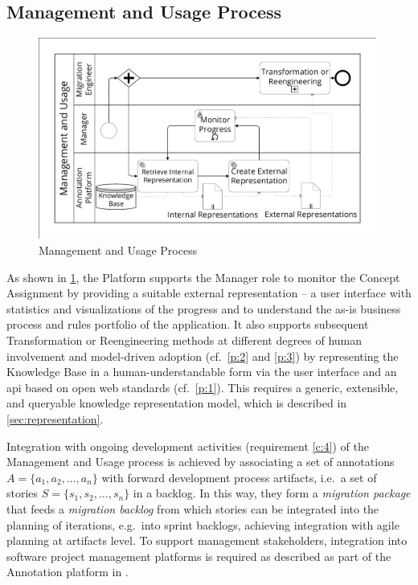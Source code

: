 \vspace{-10pt}
\hypertarget{sec:re.conceptual.process.usage}{%
\subsection{Management and Usage Process}\label{sec:re.conceptual.process.usage}}
\vspace{10pt}

\begin{figure}[h!]
\hypertarget{fig:awsm.re.usage}{%
\centering
\includegraphics[width=0.99\textwidth]{../figures/awsm-re-usage.pdf}
\caption{Management and Usage Process}\label{fig:awsm.re.usage}
}
\end{figure}
As shown in \cref{fig:awsm.re.usage}, the Platform supports the Manager role to monitor the \gls{Concept Assignment} by providing a suitable external representation -- a user interface with statistics and visualizations of the progress and to understand the as-is business process and rules portfolio of the  application.
It also supports subsequent \gls{Transformation} or \gls{Reengineering} methods at different degrees of human involvement and model-driven adoption (cf.~\cref{p:2} and \cref{p:3}) by representing the Knowledge Base in a human-understandable form via the user interface and an \gls{api} based on open \gls{web} standards (cf.~\cref{p:1}).
This requires a generic, extensible, and queryable knowledge representation model, which is described in \cref{sec:representation}.

Integration with ongoing development activities (requirement \cref{c:4}) of the Management and Usage process is achieved by associating a set of annotations \(A=\{a_1, a_2, \ldots, a_n\}\) with forward development process \glspl{artifact}, i.e.~a set of stories \(S = \{s_1, s_2, \ldots, s_n\}\) in a backlog.
In this way, they form a \emph{migration package} that feeds a \emph{migration backlog} \autocite{Heil2016AWSM} from which stories can be integrated into the planning of iterations, e.g.~into sprint backlogs, achieving integration with agile planning at \glspl{artifact} level.
To support management stakeholders, integration into software project management platforms is required as described as part of the Annotation platform in 
.

